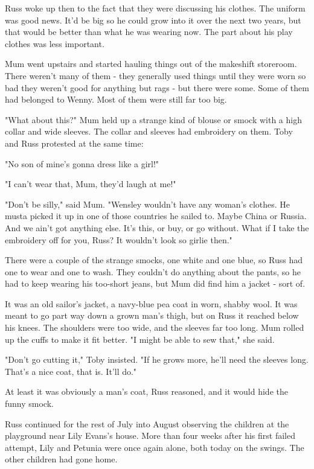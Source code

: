 \documentclass[a4paper,11pt]{article}
\begin{document}
Russ woke up then to the fact that they were discussing his clothes. The uniform was good news. It'd be big so he could grow into it over the next two years, but that would be better than what he was wearing now. The part about his play clothes was less important.

Mum went upstairs and started hauling things out of the makeshift storeroom. There weren't many of them - they generally used things until they were worn so bad they weren't good for anything but rags - but there were some. Some of them had belonged to Wenny. Most of them were still far too big.

"What about this?" Mum held up a strange kind of blouse or smock with a high collar and wide sleeves. The collar and sleeves had embroidery on them. Toby and Russ protested at the same time:

"No son of mine's gonna dress like a girl!"

"I can't wear that, Mum, they'd laugh at me!"

"Don't be silly," said Mum. "Wensley wouldn't have any woman's clothes. He musta picked it up in one of those countries he sailed to. Maybe China or Russia. And we ain't got anything else. It's this, or buy, or go without. What if I take the embroidery off for you, Russ? It wouldn't look so girlie then."

There were a couple of the strange smocks, one white and one blue, so Russ had one to wear and one to wash. They couldn't do anything about the pants, so he had to keep wearing his too-short jeans, but Mum did find him a jacket - sort of.

It was an old sailor's jacket, a navy-blue pea coat in worn, shabby wool. It was meant to go part way down a grown man's thigh, but on Russ it reached below his knees. The shoulders were too wide, and the sleeves far too long. Mum rolled up the cuffs to make it fit better. "I might be able to sew that," she said.

"Don't go cutting it," Toby insisted. "If he grows more, he'll need the sleeves long. That's a nice coat, that is. It'll do."

At least it was obviously a man's coat, Russ reasoned, and it would hide the funny smock.

Russ continued for the rest of July into August observing the children at the playground near Lily Evans's house. More than four weeks after his first failed attempt, Lily and Petunia were once again alone, both today on the swings. The other children had gone home.
\end{document}
